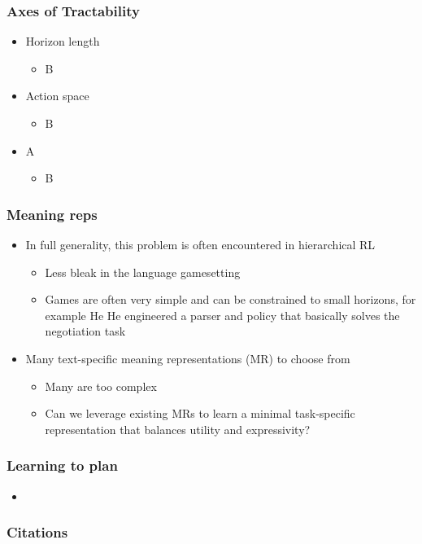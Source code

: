 \documentclass{beamer}
\begin{document}
\begin{frame}
\frametitle{Axes of Tractability}
\begin{itemize}
\item Horizon length
    \begin{itemize}
    \item B
    \end{itemize}
\item Action space
    \begin{itemize}
    \item B
    \end{itemize}
\item A
    \begin{itemize}
    \item B
    \end{itemize}
\end{itemize}
\end{frame}

\begin{frame}
\frametitle{Meaning reps}
\begin{itemize}
\item In full generality, this problem is often encountered in hierarchical RL
    \begin{itemize}
    \item Less bleak in the language gamesetting
    \item Games are often very simple and can be constrained to small horizons,
        for example He He engineered a parser and policy that basically solves
        the negotiation task
    \end{itemize}
\item Many text-specific meaning representations (MR) to choose from
    \begin{itemize}
    \item Many are too complex
    \item Can we leverage existing MRs to learn a minimal task-specific
        representation that balances utility and expressivity?
    \end{itemize}
\end{itemize}
\end{frame}

\begin{frame}
\frametitle{Learning to plan}
\begin{itemize}
\item 
\end{itemize}
\end{frame}

\begin{frame}[allowframebreaks]
\frametitle{Citations}
\printbibliography
\end{frame}
\end{document}
